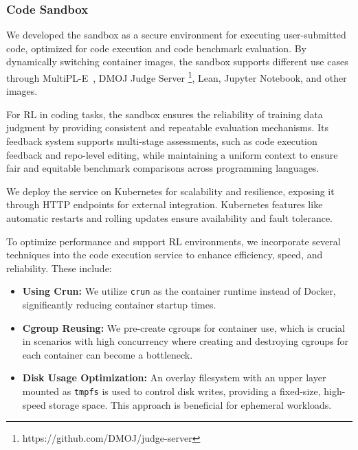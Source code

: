 \documentclass{article}
\newcommand{\citep}[1]{\parencite{#1}}
\begin{document}
\subsubsection{Code Sandbox}
\label{sec:code_box}

We developed the sandbox as a secure environment for executing user-submitted code, optimized for code execution and code benchmark evaluation. By dynamically switching container images, the sandbox supports different use cases through MultiPL-E~\citep{10103177}, DMOJ Judge Server \footnote{https://github.com/DMOJ/judge-server}, Lean, Jupyter Notebook, and other images.

For RL in coding tasks, the sandbox ensures the reliability of training data judgment by providing consistent and repeatable evaluation mechanisms. Its feedback system supports multi-stage assessments, such as code execution feedback and repo-level editing, while maintaining a uniform context to ensure fair and equitable benchmark comparisons across programming languages.

We deploy the service on Kubernetes for scalability and resilience, exposing it through HTTP endpoints for external integration. Kubernetes features like automatic restarts and rolling updates ensure availability and fault tolerance.

To optimize performance and support RL environments, we incorporate several techniques into the code execution service to enhance efficiency, speed, and reliability. These include:

\begin{itemize}
    \item \textbf{Using Crun:} We utilize \texttt{crun} as the container runtime instead of Docker, significantly reducing container startup times.
    \item \textbf{Cgroup Reusing:} We pre-create cgroups for container use, which is crucial in scenarios with high concurrency where creating and destroying cgroups for each container can become a bottleneck.
    \item \textbf{Disk Usage Optimization:} An overlay filesystem with an upper layer mounted as \texttt{tmpfs} is used to control disk writes, providing a fixed-size, high-speed storage space. This approach is beneficial for ephemeral workloads.
\end{itemize}
\end{document}
